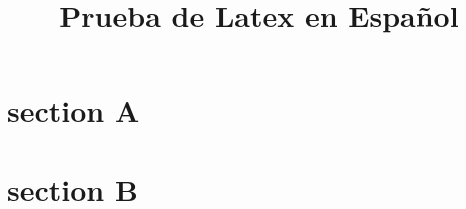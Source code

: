 \documentclass{report}
\begin{document}
\title{Prueba de Latex en Español}
\maketitle

\section{section A}

\section{section B}

\tableofcontents
\end{document}
